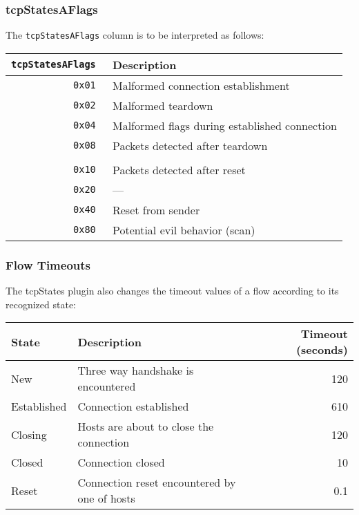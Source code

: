 \documentclass[documentation]{subfiles}
\begin{document}
\subsubsection{tcpStatesAFlags}\label{tcpStatesAFlags}
The {\tt tcpStatesAFlags} column is to be interpreted as follows:
\begin{longtable}{>{\tt}rl}
    \toprule
    {\bf tcpStatesAFlags} & {\bf Description} \\
    \midrule\endhead%
    0x01 & Malformed connection establishment \\
    0x02 & Malformed teardown \\
    0x04 & Malformed flags during established connection \\
    0x08 & Packets detected after teardown \\
    \\
    0x10 & Packets detected after reset \\
    0x20 & ---\\
    0x40 & Reset from sender \\
    0x80 & Potential evil behavior (scan)\\
    \bottomrule
\end{longtable}

\subsubsection{Flow Timeouts}
The tcpStates plugin also changes the timeout values of a flow according to its recognized state:
\begin{longtable}{llr}
    \toprule
    {\bf State} & {\bf Description}                            & {\bf Timeout (seconds)} \\
    \midrule\endhead%
    New         & Three way handshake is encountered           & 120 \\
    Established & Connection established                       & 610 \\
    Closing     & Hosts are about to close the connection      & 120 \\
    Closed      & Connection closed                            & 10 \\
    Reset       & Connection reset encountered by one of hosts & 0.1 \\
    \bottomrule
\end{longtable}
\end{document}
